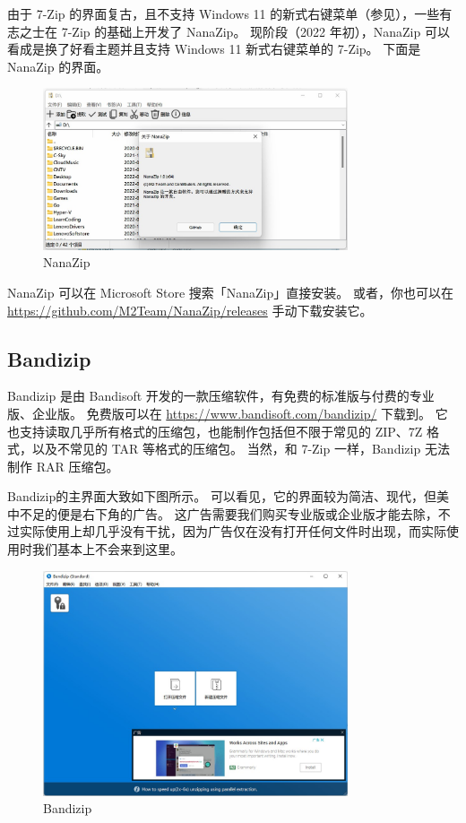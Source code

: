 由于 7-Zip 的界面复古，且不支持 Windows 11 的新式右键菜单（参见），一些有志之士在 7-Zip 的基础上开发了 NanaZip。
现阶段（2022 年初），NanaZip 可以看成是换了好看主题并且支持 Windows 11 新式右键菜单的 7-Zip。
下面是 NanaZip 的界面。

\begin{figure}[htb!]
  \centering
  \includegraphics[width=9cm]{assets/NanaZip.jpg}
  \caption{NanaZip}
  \label{NanaZip}
\end{figure}

NanaZip 可以在 Microsoft Store 搜索「NanaZip」直接安装。
或者，你也可以在 \url{https://github.com/M2Team/NanaZip/releases} 手动下载安装它。

\subsection{Bandizip}

Bandizip 是由 Bandisoft 开发的一款压缩软件，有免费的标准版与付费的专业版、企业版。
免费版可以在 \url{https://www.bandisoft.com/bandizip/} 下载到。
它也支持读取几乎所有格式的压缩包，也能制作包括但不限于常见的 ZIP、7Z 格式，以及不常见的 TAR 等格式的压缩包。
当然，和 7-Zip 一样，Bandizip 无法制作 RAR 压缩包。

Bandizip的主界面大致如下图所示。
可以看见，它的界面较为简洁、现代，但美中不足的便是右下角的广告。
这广告需要我们购买专业版或企业版才能去除，不过实际使用上却几乎没有干扰，因为广告仅在没有打开任何文件时出现，而实际使用时我们基本上不会来到这里。

\begin{figure}[htb!]
  \centering
  \includegraphics[width=9cm]{assets/Bandizip.jpg}
  \caption{Bandizip}
  \label{Bandizip}
\end{figure}


